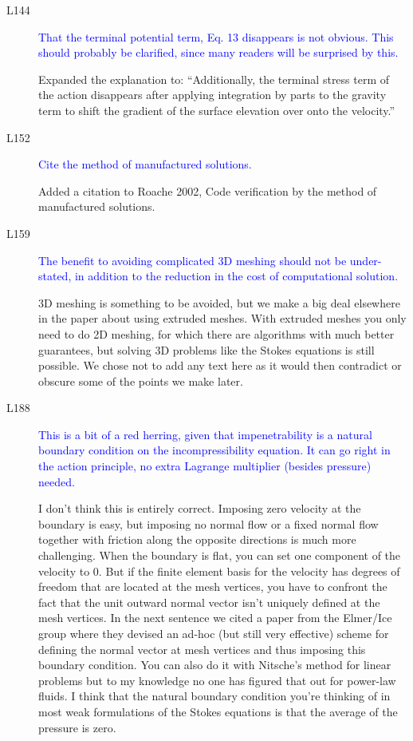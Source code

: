 \documentclass{article}
\theoremstyle{definition}
\theoremstyle{plain}
\begin{document}
\begin{description}
\item[L144] \textcolor{blue}{That the terminal potential term, Eq. 13 disappears is not obvious. This
should probably be clarified, since many readers will be surprised by this.}

Expanded the explanation to: ``Additionally, the terminal stress term of the action disappears after applying integration by parts to the gravity term to shift the gradient of the surface elevation over onto the velocity.''

\item[L152] \textcolor{blue}{Cite the method of manufactured solutions.}

Added a citation to Roache 2002, Code verification by the method of manufactured solutions.

\item[L159] \textcolor{blue}{The benefit to avoiding complicated 3D meshing should not be under-
stated, in addition to the reduction in the cost of computational solution.}

3D meshing is something to be avoided, but we make a big deal elsewhere in the paper about using extruded meshes.
With extruded meshes you only need to do 2D meshing, for which there are algorithms with much better guarantees, but solving 3D problems like the Stokes equations is still possible.
We chose not to add any text here as it would then contradict or obscure some of the points we make later.

\item[L188] \textcolor{blue}{This is a bit of a red herring, given that impenetrability is a natural
boundary condition on the incompressibility equation. It can go right
in the action principle, no extra Lagrange multiplier (besides pressure)
needed.}

I don't think this is entirely correct.
Imposing zero velocity at the boundary is easy, but imposing no normal flow or a fixed normal flow together with friction along the opposite directions is much more challenging.
When the boundary is flat, you can set one component of the velocity to 0.
But if the finite element basis for the velocity has degrees of freedom that are located at the mesh vertices, you have to confront the fact that the unit outward normal vector isn't uniquely defined at the mesh vertices.
In the next sentence we cited a paper from the Elmer/Ice group where they devised an ad-hoc (but still very effective) scheme for defining the normal vector at mesh vertices and thus imposing this boundary condition.
You can also do it with Nitsche's method for linear problems but to my knowledge no one has figured that out for power-law fluids.
I think that the natural boundary condition you're thinking of in most weak formulations of the Stokes equations is that the average of the pressure is zero.


\end{description}
\end{document}
